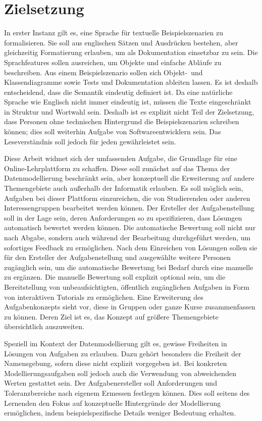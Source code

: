 \chapter{Zielsetzung}\label{ch:goals}

In erster Instanz gilt es, eine Sprache für textuelle Beispielszenarien zu formalisieren.
Sie soll aus englischen Sätzen und Ausdrücken bestehen, aber gleichzeitig Formatierung erlauben, um als Dokumentation einsetzbar zu sein.
Die Sprachfeatures sollen ausreichen, um Objekte und einfache Abläufe zu beschreiben.
Aus einem Beispielszenario sollen sich Objekt-\ und Klassendiagramme sowie Tests und Dokumentation ableiten lassen.
Es ist deshalb entscheidend, dass die Semantik eindeutig definiert ist.
Da eine natürliche Sprache wie Englisch nicht immer eindeutig ist, müssen die Texte eingeschränkt in Struktur und Wortwahl sein.
Deshalb ist es explizit nicht Teil der Zielsetzung, dass Personen ohne technischen Hintergrund die Beispielszenarien schreiben können;
dies soll weiterhin Aufgabe von Softwareentwicklern sein.
Das Leseverständnis soll jedoch für jeden gewährleistet sein.

Diese Arbeit widmet sich der umfassenden Aufgabe, die Grundlage für eine Online-Lehrplattform zu schaffen.
Diese soll zunächst auf das Thema der Datenmodellierung beschränkt sein, aber konzeptuell die Erweiterung auf andere Themengebiete auch außerhalb der Informatik erlauben.
Es soll möglich sein, Aufgaben bei dieser Plattform einzureichen, die von Studierenden oder anderen Interessengruppen bearbeitet werden können.
Der Ersteller der Aufgabenstellung soll in der Lage sein, deren Anforderungen so zu spezifizieren, dass Lösungen automatisch bewertet werden können.
Die automatische Bewertung soll nicht nur nach Abgabe, sondern auch während der Bearbeitung durchgeführt werden, um sofortiges Feedback zu ermöglichen.
Nach dem Einreichen von Lösungen sollen sie für den Ersteller der Aufgabenstellung und ausgewählte weitere Personen zugänglich sein, um die automatische Bewertung bei Bedarf durch eine manuelle zu ergänzen.
Die manuelle Bewertung soll explizit optional sein, um die Bereitstellung von unbeaufsichtigten, öffentlich zugänglichen Aufgaben in Form von interaktiven Tutorials zu ermöglichen.
Eine Erweiterung des Aufgabenkonzepts sieht vor, diese in Gruppen oder ganze Kurse zusammenfassen zu können.
Deren Ziel ist es, das Konzept auf größere Themengebiete übersichtlich auszuweiten.

Speziell im Kontext der Datenmodellierung gilt es, gewisse Freiheiten in Lösungen von Aufgaben zu erlauben.
Dazu gehört besonders die Freiheit der Namensgebung, sofern diese nicht explizit vorgegeben ist.
Bei konkreten Modellierungsaufgaben soll jedoch auch die Verwendung von abweichenden Werten gestattet sein.
Der Aufgabenersteller soll Anforderungen und Toleranzbereiche nach eigenem Ermessen festlegen können.
Dies soll seitens des Lernenden den Fokus auf konzeptuelle Hintergründe der Modellierung ermöglichen, indem beispielspezifische Details weniger Bedeutung erhalten.
